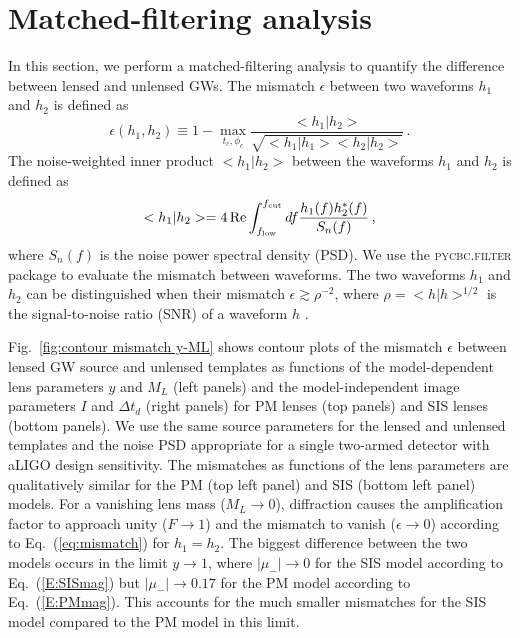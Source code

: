 \documentclass[floats,floatfix,showpacs,amssymb,prd,twocolumn,superscriptaddress,nofootinbib,nolongbibliography,reprint]{revtex4-2}
\begin{document}
\section{\label{sec: Match filtering analysis} Matched-filtering analysis}

In this section, we perform a matched-filtering analysis to quantify the difference between lensed and unlensed GWs. The mismatch $\epsilon$ between two waveforms $h_1$ and $h_2$ is defined as \cite{PhysRevD.49.2658}
\begin{equation}\label{eq:mismatch}
    \epsilon (h_1, h_2) \equiv 1 -  \max\limits_{t_c, \phi_c} \frac{<h_1|h_2>}{\sqrt{<h_1|h_1><h_2|h_2>}}\,.
\end{equation}
The noise-weighted inner product $<h_1|h_2>$ between the waveforms $h_1$ and $h_2$ is defined as
\begin{equation}\label{eq:inner product}
    <h_1|h_2> = 4\,\text{Re} \int_{f_{\rm low}}^{f_{\rm cut}} df \frac{h_1(f) h_2^*(f)}{S_n(f)}\,,
\end{equation}
where $S_n(f)$ is the noise power spectral density (PSD). We use the \textsc{pycbc.filter} package \cite{alex_nitz_2022_6324278} to evaluate the mismatch between waveforms. The two waveforms $h_1$ and $h_2$ can be distinguished when their mismatch $\epsilon \gtrsim \rho^{-2}$, where $\rho = <h|h>^{1/2}$ is the signal-to-noise ratio (SNR) of a waveform $h$ \cite{1992PhRvD..46.5236F,1993PhRvD..47.2198F,PhysRevD.49.2658}.

Fig.~\ref{fig:contour mismatch y-ML} shows contour plots of the mismatch $\epsilon$ between lensed GW source and unlensed templates as functions of the model-dependent lens parameters $y$ and $M_L$ (left panels) and the model-independent image parameters $I$ and $\Delta t_d$ (right panels) for PM lenses (top panels) and SIS lenses (bottom panels). We use the same source parameters for the lensed and unlensed templates and the noise PSD appropriate for a single two-armed detector with aLIGO design sensitivity.  The mismatches as functions of the lens parameters are qualitatively similar for the PM (top left panel) and SIS (bottom left panel) models.  For a vanishing lens mass ($M_L \to 0$), diffraction causes the amplification factor to approach unity ($F \to 1$) and the mismatch to vanish ($\epsilon \to 0$) according to Eq.~(\ref{eq:mismatch}) for $h_1 = h_2$.  The biggest difference between the two models occurs in the limit $y \to 1$, where $|\mu_-| \to 0$ for the SIS model according to Eq.~(\ref{E:SISmag}) but $|\mu_-| \to 0.17$ for the PM model according to Eq.~(\ref{E:PMmag}).  This accounts for the much smaller mismatches for the SIS model compared to the PM model in this limit.
\end{document}
